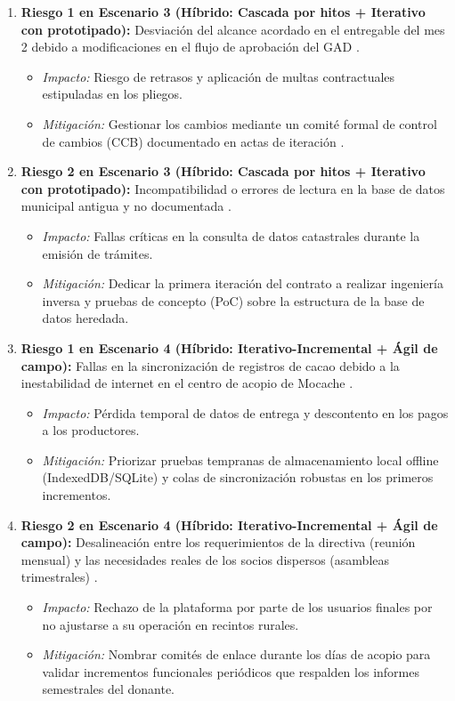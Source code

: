 \documentclass[12pt,a4paper]{article}
\begin{document}
\begin{enumerate}
    \item \textbf{Riesgo 1 en Escenario 3 (Híbrido: Cascada por hitos + Iterativo con prototipado):} Desviación del alcance acordado en el entregable del mes 2 debido a modificaciones en el flujo de aprobación del GAD \cite{GA_Prac_01}.
        \begin{itemize}
            \item \textit{Impacto:} Riesgo de retrasos y aplicación de multas contractuales estipuladas en los pliegos.
            \item \textit{Mitigación:} Gestionar los cambios mediante un comité formal de control de cambios (CCB) documentado en actas de iteración \cite{Pohl2025}.
        \end{itemize}
    \item \textbf{Riesgo 2 en Escenario 3 (Híbrido: Cascada por hitos + Iterativo con prototipado):} Incompatibilidad o errores de lectura en la base de datos municipal antigua y no documentada \cite{GA_Prac_01}.
        \begin{itemize}
            \item \textit{Impacto:} Fallas críticas en la consulta de datos catastrales durante la emisión de trámites.
            \item \textit{Mitigación:} Dedicar la primera iteración del contrato a realizar ingeniería inversa y pruebas de concepto (PoC) sobre la estructura de la base de datos heredada.
        \end{itemize}

    \item \textbf{Riesgo 1 en Escenario 4 (Híbrido: Iterativo-Incremental + Ágil de campo):} Fallas en la sincronización de registros de cacao debido a la inestabilidad de internet en el centro de acopio de Mocache \cite{GA_Prac_01}.
        \begin{itemize}
            \item \textit{Impacto:} Pérdida temporal de datos de entrega y descontento en los pagos a los productores.
            \item \textit{Mitigación:} Priorizar pruebas tempranas de almacenamiento local offline (IndexedDB/SQLite) y colas de sincronización robustas en los primeros incrementos.
        \end{itemize}
    \item \textbf{Riesgo 2 en Escenario 4 (Híbrido: Iterativo-Incremental + Ágil de campo):} Desalineación entre los requerimientos de la directiva (reunión mensual) y las necesidades reales de los socios dispersos (asambleas trimestrales) \cite{GA_Prac_01}.
        \begin{itemize}
            \item \textit{Impacto:} Rechazo de la plataforma por parte de los usuarios finales por no ajustarse a su operación en recintos rurales.
            \item \textit{Mitigación:} Nombrar comités de enlace durante los días de acopio para validar incrementos funcionales periódicos que respalden los informes semestrales del donante.
        \end{itemize}
\end{enumerate}
\end{document}
